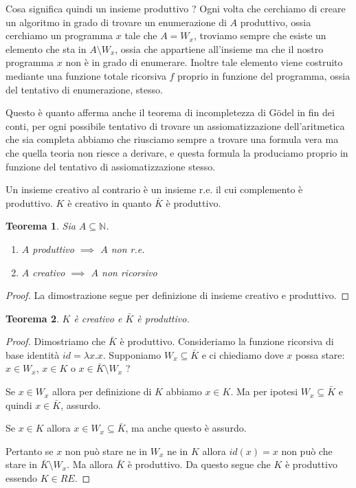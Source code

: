\documentclass[a4paper,titlepage]{article}
\newtheorem{theorem}{Teorema}[section]
\theoremstyle{definition}
\newcommand{\N}{\mathbb{N}}
\begin{document}
Cosa significa quindi un insieme produttivo ? Ogni volta che cerchiamo di creare un algoritmo in grado di trovare un enumerazione di $A$ produttivo, ossia cerchiamo un programma $x$ tale che $A = W_x$, troviamo sempre che esiste un elemento che sta in $A\setminus W_x$, ossia che appartiene all'insieme ma che il nostro programma $x$ non è in grado di enumerare. Inoltre tale elemento viene costruito mediante una funzione totale ricorsiva $f$ proprio in funzione del programma, ossia del tentativo di enumerazione, stesso. 

Questo è quanto afferma anche il teorema di incompletezza di Gödel in fin dei conti, per ogni possibile tentativo di trovare un assiomatizzazione dell'aritmetica che sia completa abbiamo che riusciamo sempre a trovare una formula vera ma che quella teoria non riesce a derivare, e questa formula la produciamo proprio in funzione del tentativo di assiomatizzazione stesso. 

Un insieme creativo al contrario è un insieme r.e. il cui complemento è produttivo. $K$ è creativo in quanto $\bar K$ è produttivo.
\begin{theorem}
	Sia $A\subseteq\N$.
	\begin{enumerate}[(1)]
		\item $A$ produttivo $\implies$ $A$ non r.e. 
		\item $A$ creativo $\implies$ $A$ non ricorsivo
	\end{enumerate}
\end{theorem}
\begin{proof}
	La dimostrazione segue per definizione di insieme creativo e produttivo. 
\end{proof}

\begin{theorem}
	$K$ è creativo e $\bar K$ è produttivo. 
\end{theorem}
\begin{proof}
	Dimostriamo che $\bar K$ è produttivo. Consideriamo la funzione ricorsiva di base identità $id = \lambda x.x$. Supponiamo $W_x\subseteq\bar K$ e ci chiediamo dove $x$ possa stare:  $x\in W_x$, $x\in K$ o $x\in\bar K\setminus W_x$ ?
	
	Se $x\in W_x$ allora per definizione di $K$ abbiamo $x\in K$. Ma per ipotesi $W_x\subseteq\bar K$ e quindi $x\in\bar K$, assurdo. 
	
	Se $x\in K$ allora $x\in W_x\subseteq\bar K$, ma anche questo è assurdo. 
	
	Pertanto se $x$ non può stare ne in $W_x$ ne in $K$ allora $id(x)=x$ non può che stare in $\bar K\setminus W_x$. Ma allora $\bar K$ è produttivo. Da questo segue che $K$ è produttivo essendo $K\in RE$.
\end{proof}
\end{document}

